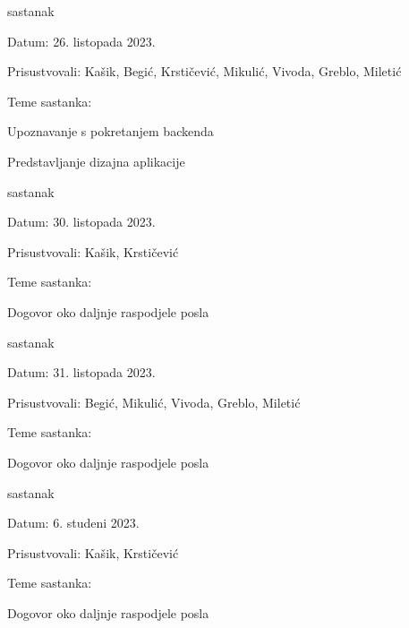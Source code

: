 \begin{packed_enum}
	\item  sastanak
	\item[] \begin{packed_item}
		\item Datum: 26. listopada 2023.
		\item Prisustvovali: Kašik, Begić, Krstičević, Mikulić, Vivoda, Greblo, Miletić
		\item Teme sastanka:
		\begin{packed_item}
			\item  Upoznavanje s pokretanjem backenda
			\item  Predstavljanje dizajna aplikacije
		\end{packed_item}
	\end{packed_item}
	
	\item  sastanak
	\item[] \begin{packed_item}
		\item Datum: 30. listopada 2023.
		\item Prisustvovali: Kašik, Krstičević
		\item Teme sastanka:
		\begin{packed_item}
			\item  Dogovor oko daljnje raspodjele posla
		\end{packed_item}
	\end{packed_item}
	
	\item  sastanak
	\item[] \begin{packed_item}
		\item Datum: 31. listopada 2023.
		\item Prisustvovali: Begić, Mikulić, Vivoda, Greblo, Miletić
		\item Teme sastanka:
		\begin{packed_item}
			\item  Dogovor oko daljnje raspodjele posla
		\end{packed_item}
	\end{packed_item}
	
	\item  sastanak
	\item[] \begin{packed_item}
		\item Datum: 6. studeni 2023.
		\item Prisustvovali: Kašik, Krstičević
		\item Teme sastanka:
		\begin{packed_item}
			\item  Dogovor oko daljnje raspodjele posla
		\end{packed_item}
	\end{packed_item}
	

\end{packed_enum}
